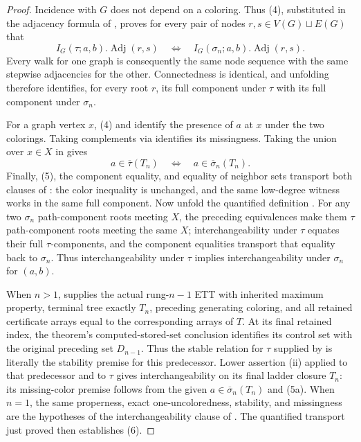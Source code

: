 \begin{proof}
Incidence with $G$ does not depend on a coloring.  Thus (4), substituted
in the adjacency formula of , proves for
every pair of nodes $r,s\in V(G)\sqcup E(G)$ that
\[
 I_G(\tau;a,b).\operatorname{Adj}(r,s)
 \quad\Longleftrightarrow\quad
 I_G(\sigma_n;a,b).\operatorname{Adj}(r,s).                  \tag{5}
\]
Every walk for one graph is consequently the same node sequence with the
same stepwise adjacencies for the other.  Connectedness is identical, and
unfolding  therefore identifies, for every
root $r$, its full component under $\tau$ with its full component under
$\sigma_n$.

For a graph vertex $x$, (4) and  identify the
presence of $a$ at $x$ under the two colorings.  Taking complements via
 identifies its missingness.  Taking the union over
$x\in X$ in  gives
\[
       a\in\overline\tau(T_n)
       \quad\Longleftrightarrow\quad
       a\in\overline\sigma_n(T_n).                           \tag{5a}
\]
Finally, (5), the component equality, and equality of neighbor sets
transport both clauses of : the color
inequality is unchanged, and the same low-degree witness works in the
same full component.  Now unfold the quantified definition
.  For any two $\sigma_n$ path-component
roots meeting $X$, the preceding equivalences make them $\tau$
path-component roots meeting the same $X$; interchangeability under
$\tau$ equates their full $\tau$-components, and the component equalities
transport that equality back to $\sigma_n$.  Thus interchangeability
under $\tau$ implies interchangeability under $\sigma_n$ for $(a,b)$.

When $n>1$,  supplies the actual
rung-$n-1$ ETT with inherited maximum property, terminal tree exactly
$T_n$, preceding generating coloring, and all retained certificate
arrays equal to the corresponding arrays of $T$.  At its final retained
index, the theorem's computed-stored-set conclusion identifies its
control set with the original preceding set $D_{n-1}$.  Thus the stable
relation for $\tau$ supplied by  is
literally the stability premise for this predecessor.  Lower assertion
(ii) applied to that predecessor and to $\tau$ gives interchangeability on its
final ladder closure $T_n$: its missing-color premise follows from the
given $a\in\overline\sigma_n(T_n)$ and (5a).  When $n=1$, the same
properness, exact one-uncoloredness, stability, and missingness are the
hypotheses of the interchangeability clause of
.  The quantified transport just proved
then establishes (6).


\end{proof}
